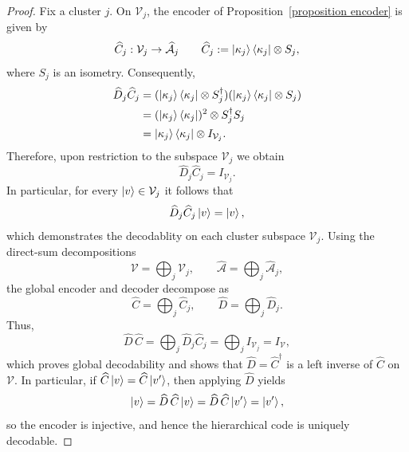 \documentclass[10pt,a4paper]{amsart}
\begin{document}
\begin{proof}
Fix a cluster $j$. On $\mathcal{V}_j$, the encoder of Proposition~\ref{proposition encoder} is given by
\[
  \widehat{C}_j: \mathcal{V}_j \to \widehat{\mathcal{A}}_j \qquad
    \widehat{C}_j := \ket{\kappa_j}\bra{\kappa_j} \otimes S_j,
\]
where $S_j$ is an isometry. Consequently,
\begin{align*}
    \widehat{D}_j \widehat{C}_j
    &= (\ket{\kappa_j}\bra{\kappa_j} \otimes S_j^\dagger)
      (\ket{\kappa_j}\bra{\kappa_j} \otimes S_j)\\
    &= (\ket{\kappa_j}\bra{\kappa_j})^2 \otimes S_j^\dagger S_j\\
    &= \ket{\kappa_j}\bra{\kappa_j} \otimes I_{\mathcal{V}_j}.
\end{align*}
Therefore, upon restriction to the subspace $\mathcal{V}_j$ we obtain
\[
  \widehat{D}_j \widehat{C}_j = I_{\mathcal{V}_j}.
\]
In particular, for every $\ket{v} \in \mathcal{V}_j$ it follows that
\[
  \widehat{D}_j \widehat{C}_j \ket{v} = \ket{v},
\]
which demonstrates the decodablity on each cluster subspace $\mathcal{V}_j$.
Using the direct-sum decompositions
\[
  \mathcal{V} = \bigoplus_j \mathcal{V}_j,
  \qquad
  \widehat{\mathcal{A}} = \bigoplus_j \widehat{\mathcal{A}}_j,
\]
the global encoder and decoder decompose as
\[
  \widehat{C} = \bigoplus_j \widehat{C}_j,
  \qquad
  \widehat{D} = \bigoplus_j \widehat{D}_j.
\]
Thus,\[
  \widehat{D}\,\widehat{C}
    = \bigoplus_j \widehat{D}_j \widehat{C}_j
    = \bigoplus_j I_{\mathcal{V}_j}
    = I_{\mathcal{V}},
\]
which proves global decodability and shows that
$\widehat{D} = \widehat{C}^\dagger$ is a left inverse of
$\widehat{C}$ on $\mathcal{V}$. 
In particular, if $\widehat{C}\ket{v} = \widehat{C}\ket{v'}$, then
applying $\widehat{D}$ yields
\[
  \ket{v}
    = \widehat{D}\,\widehat{C}\ket{v}
    = \widehat{D}\,\widehat{C}\ket{v'}
    = \ket{v'},
\]
so the encoder is injective, and hence the hierarchical code is uniquely
decodable. 
\end{proof}
\end{document}
